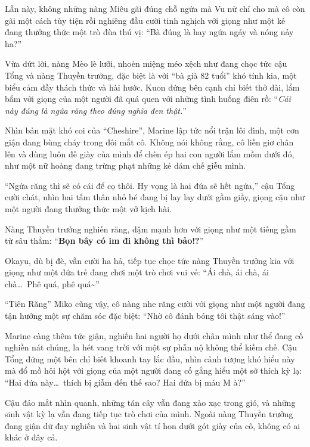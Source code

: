 \documentclass[../main.tex]{subfiles}
\begin{document}
Lần này, không những nàng Miêu gãi đúng chỗ ngứa mà Vu nữ chỉ cho mà cô còn gãi một cách tùy tiện rồi nghiêng đầu cười tinh nghịch với giọng như một kẻ đang thưởng thức một trò đùa thú vị: ``Bà đúng là hay ngứa ngáy và nóng nảy ha?''

Vừa dứt lời, nàng Mèo lè lưỡi, nhoẻn miệng méo xệch như đang chọc tức cậu Tổng và nàng Thuyền trưởng, đặc biệt là với ``bà già 82 tuổi'' khó tính kia, một biểu cảm đầy thách thức và hài hước. Kuon đứng bên cạnh chỉ biết thở dài, lẩm bẩm với giọng của một người đã quá quen với những tình huống điên rồ: ``\textit{Cái này đúng là ngứa răng theo đúng nghĩa đen thật.}''

Nhìn bản mặt khó coi của ``Cheshire'', Marine lập tức nổi trận lôi đình, một cơn giận đang bùng cháy trong đôi mắt cô. Không nói không rằng, cô liền giơ chân lên và dùng luôn đế giày của mình để chèn ép hai con người lắm mồm dưới đó, như một nữ hoàng đang trừng phạt những kẻ dám chế giễu mình.


``Ngứa răng thì sẽ có cái để cọ thôi. Hy vọng là hai đứa sẽ hết ngứa,'' cậu Tổng cười chát, nhìn hai tấm thân nhỏ bé đang bị lay lay dưới gầm giầy, giọng cậu như một người đang thưởng thức một vở kịch hài.

Nàng Thuyền trưởng nghiến răng, dậm mạnh hơn với giọng như một tiếng gầm từ sâu thẳm: ``\textbf{Bọn bây có im đi không thì bảo!?}''

Okayu, dù bị đè, vẫn cười ha hả, tiếp tục chọc tức nàng Thuyền trưởng kia với giọng như một đứa trẻ đang chơi một trò chơi vui vẻ: ``Ái chà, ái chà, ái chà\dots\ Phê quá, phê quá\~{}''

``Tiên Răng'' Miko cũng vậy, cô nàng nhe răng cười với giọng như một người đang tận hưởng một sự chăm sóc đặc biệt: ``Nhờ cô đánh bóng tôi thật sáng vào!''

Marine càng thêm tức giận, nghiến hai người họ dưới chân mình như thể đang cố nghiền nát chúng, la hét vang trời với một sự phẫn nộ không thể kiềm chế. Cậu Tổng đứng một bên chỉ biết khoanh tay lắc đầu, nhìn cảnh tượng khó hiểu này mà đổ mồ hôi hột với giọng của một người đang cố gắng hiểu một sở thích kỳ lạ: ``Hai đứa này\dots\ thích bị giẫm đến thế sao? Hai đứa bị máu M à?''

Cậu đảo mắt nhìn quanh, những tán cây vẫn đang xào xạc trong gió, và những sinh vật kỳ lạ vẫn đang tiếp tục trò chơi của mình. Ngoài nàng Thuyền trưởng đang giận dữ đay nghiến và hai sinh vật tí hon dưới gót giày của cô, không có ai khác ở đây cả.
\end{document}
